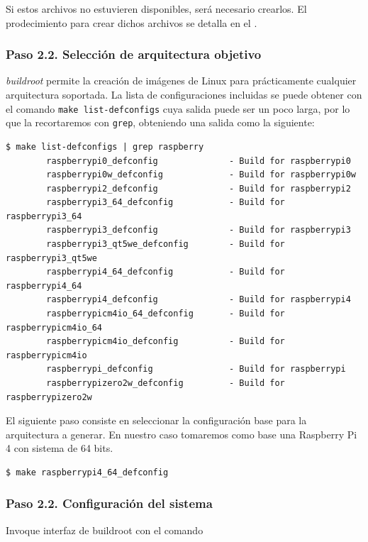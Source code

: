 Si estos archivos no estuvieren disponibles, será necesario crearlos.
El prodecimiento para crear dichos archivos se detalla en el .




\subsubsection*{Paso 2.2. Selección de arquitectura objetivo}

\emph{buildroot} permite la creación de imágenes de Linux para prácticamente cualquier arquitectura soportada.
La lista de configuraciones incluidas se puede obtener con el comando \texttt{make list-defconfigs} cuya salida puede ser un poco larga, por lo que la recortaremos con \texttt{grep}, obteniendo una salida como la siguiente:

\begin{Verbatim}[gobble=1]
	$ make list-defconfigs | grep raspberry
	    raspberrypi0_defconfig              - Build for raspberrypi0
	    raspberrypi0w_defconfig             - Build for raspberrypi0w
	    raspberrypi2_defconfig              - Build for raspberrypi2
	    raspberrypi3_64_defconfig           - Build for raspberrypi3_64
	    raspberrypi3_defconfig              - Build for raspberrypi3
	    raspberrypi3_qt5we_defconfig        - Build for raspberrypi3_qt5we
	    raspberrypi4_64_defconfig           - Build for raspberrypi4_64
	    raspberrypi4_defconfig              - Build for raspberrypi4
	    raspberrypicm4io_64_defconfig       - Build for raspberrypicm4io_64
	    raspberrypicm4io_defconfig          - Build for raspberrypicm4io
	    raspberrypi_defconfig               - Build for raspberrypi
	    raspberrypizero2w_defconfig         - Build for raspberrypizero2w
\end{Verbatim}

El siguiente paso consiste en seleccionar la configuración base para la arquitectura a generar.
En nuestro caso tomaremos como base una Raspberry Pi 4 con sistema de 64 bits.
\begin{Verbatim}[gobble=1]
	$ make raspberrypi4_64_defconfig
\end{Verbatim}




\subsubsection*{Paso 2.2. Configuración del sistema}
Invoque interfaz de buildroot con el comando

